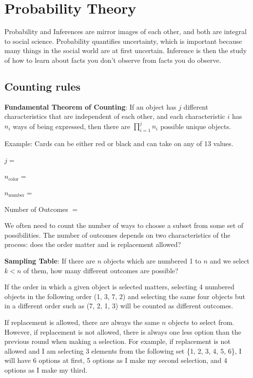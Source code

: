 \documentclass[
]{book}
\theoremstyle{definition}
\theoremstyle{definition}
\theoremstyle{definition}
\theoremstyle{remark}
\begin{document}
\hypertarget{probability-theory}{%
\chapter{Probability Theory}\label{probability-theory}}

Probability and Inferences are mirror images of each other, and both are integral to social science. Probability quantifies uncertainty, which is important because many things in the social world are at first uncertain. Inference is then the study of how to learn about facts you don't observe from facts you do observe.

\hypertarget{counting-rules}{%
\section{Counting rules}\label{counting-rules}}

\textbf{Fundamental Theorem of Counting}: If an object has \(j\) different characteristics that are independent of each other, and each characteristic \(i\) has \(n_i\) ways of being expressed, then there are \(\prod_{i = 1}^j n_i\) possible unique objects.

Example: Cards can be either red or black and can take on any of 13 values.

\(j =\)

\(n_{\text{color}} =\)

\(n_{\text{number}} =\)

Number of Outcomes \(=\)

We often need to count the number of ways to choose a subset from some set of possibilities. The number of outcomes depends on two characteristics of the process: does the order matter and is replacement allowed?

\textbf{Sampling Table}: If there are \(n\) objects which are numbered 1 to \(n\) and we select \(k < n\) of them, how many different outcomes are possible?

If the order in which a given object is selected matters, selecting 4 numbered objects in the following order (1, 3, 7, 2) and selecting the same four objects but in a different order such as (7, 2, 1, 3) will be counted as different outcomes.

If replacement is allowed, there are always the same \(n\) objects to select from. However, if replacement is not allowed, there is always one less option than the previous round when making a selection. For example, if replacement is not allowed and I am selecting 3 elements from the following set \{1, 2, 3, 4, 5, 6\}, I will have 6 options at first, 5 options as I make my second selection, and 4 options as I make my third.
\end{document}
